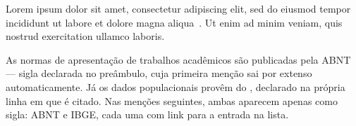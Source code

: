 
Lorem ipsum dolor sit amet, consectetur adipiscing elit, sed do eiusmod tempor
incididunt ut labore et dolore magna aliqua~\parencite{exemplo-livro}. Ut enim ad
minim veniam, quis nostrud exercitation ullamco laboris.

%
%
%
%
As normas de apresentação de trabalhos acadêmicos são publicadas pela
\gls{ABNT} --- sigla declarada no preâmbulo, cuja primeira menção sai por
extenso automaticamente. Já os dados populacionais provêm do
, declarado na
própria linha em que é citado. Nas menções seguintes, ambas aparecem apenas
como sigla: \gls{ABNT} e \gls{IBGE}, cada uma com link para a entrada na lista.


